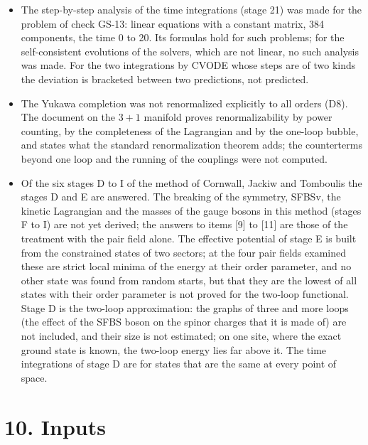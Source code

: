 \documentclass[
  10pt,
]{article}
\begin{document}
\begin{itemize}
  bound states of walls of the width
  \(\Delta^\infty_{\rm LL}\ell^{\rm K}_{\rm LL}>1\) were checked through
  the two scalar operators of the square of the operator, not on the
  lattice.
\item
  The step-by-step analysis of the time integrations (stage 21) was made
  for the problem of check GS-13: linear equations with a constant
  matrix, 384 components, the time 0 to 20. Its formulas hold for such
  problems; for the self-consistent evolutions of the solvers, which are
  not linear, no such analysis was made. For the two integrations by
  CVODE whose steps are of two kinds the deviation is bracketed between
  two predictions, not predicted.
\item
  The Yukawa completion was not renormalized explicitly to all orders
  (D8). The document on the \(3+1\) manifold proves renormalizability by
  power counting, by the completeness of the Lagrangian and by the
  one-loop bubble, and states what the standard renormalization theorem
  adds; the counterterms beyond one loop and the running of the
  couplings were not computed.
\item
  Of the six stages D to I of the method of Cornwall, Jackiw and
  Tomboulis the stages D and E are answered. The breaking of the
  symmetry, SFBSv, the kinetic Lagrangian and the masses of the gauge
  bosons in this method (stages F to I) are not yet derived; the answers
  to items {[}9{]} to {[}11{]} are those of the treatment with the pair
  field alone. The effective potential of stage E is built from the
  constrained states of two sectors; at the four pair fields examined
  these are strict local minima of the energy at their order parameter,
  and no other state was found from random starts, but that they are the
  lowest of all states with their order parameter is not proved for the
  two-loop functional. Stage D is the two-loop approximation: the graphs
  of three and more loops (the effect of the SFBS boson on the spinor
  charges that it is made of) are not included, and their size is not
  estimated; on one site, where the exact ground state is known, the
  two-loop energy lies far above it. The time integrations of stage D
  are for states that are the same at every point of space.
\end{itemize}

\hypertarget{inputs}{%
\section{10. Inputs}\label{inputs}}
\end{document}
